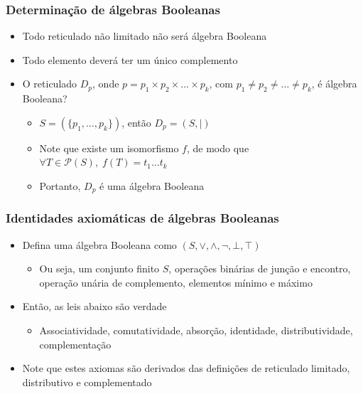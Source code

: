 \documentclass[12pt]{beamer}
\begin{document}
\begin{frame}
  \frametitle{Determinação de álgebras Booleanas}
  \begin{itemize}
    \item<1-> Todo reticulado não limitado não será álgebra Booleana
    \item<2-> Todo elemento deverá ter um único complemento
    \item<3-> O reticulado $D_{p}$, onde $p = p_{1} \times p_{2} \times \dots
        \times p_{k}$, com $p_{1} \neq p_{2} \neq \dots \neq p_{k}$, é álgebra
          Booleana?
    \begin{itemize}[itemsep=0pt]
      \item $S = (\{p_{1}, \dots, p_{k}\})$, então $D_{p} = (S, \mid)$
      \item<4-> Note que existe um isomorfismo $f$, de modo que $\forall T \in
          \mathcal{P}(S),\; f(T) = t_1 \dots t_{k}$
      \item<5-> Portanto, $D_{p}$ é uma álgebra Booleana
    \end{itemize}
  \end{itemize}
\end{frame}

\begin{frame}
  \frametitle{Identidades axiomáticas de álgebras Booleanas}
  \begin{itemize}
    \item<1-> Defina uma álgebra Booleana como $(S, \vee, \wedge, \neg, \bot,
        \top)$
    \begin{itemize}
      \item Ou seja, um conjunto finito $S$, operações binárias de junção e
          encontro, operação unária de complemento, elementos mínimo e máximo
    \end{itemize}
    \item<2-> Então, as leis abaixo são verdade
    \begin{itemize}
      \item Associatividade, comutatividade, absorção, identidade,
          distributividade, complementação
    \end{itemize}
    \item<3-> Note que estes axiomas são derivados das definições de reticulado
        limitado, distributivo e complementado
  \end{itemize}
\end{frame}
\end{document}
